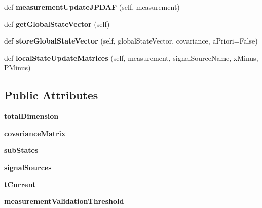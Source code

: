 \begin{DoxyCompactItemize}
\item 
def {\bfseries measurement\+Update\+J\+P\+D\+AF} (self, measurement)\hypertarget{classState_1_1ModularFilter_a0da499cc21acaf9753711553102b5469}{}\label{classState_1_1ModularFilter_a0da499cc21acaf9753711553102b5469}

\item 
def {\bfseries get\+Global\+State\+Vector} (self)\hypertarget{classState_1_1ModularFilter_a6547493c7b2ad077dfae3e76b5619a0e}{}\label{classState_1_1ModularFilter_a6547493c7b2ad077dfae3e76b5619a0e}

\item 
def {\bfseries store\+Global\+State\+Vector} (self, global\+State\+Vector, covariance, a\+Priori=False)\hypertarget{classState_1_1ModularFilter_a3c510ca8c96da3b0e26215935e18beaa}{}\label{classState_1_1ModularFilter_a3c510ca8c96da3b0e26215935e18beaa}

\item 
def {\bfseries local\+State\+Update\+Matrices} (self, measurement, signal\+Source\+Name, x\+Minus, P\+Minus)\hypertarget{classState_1_1ModularFilter_a90d6a9c3ae7a248577d4be06dd58a0c8}{}\label{classState_1_1ModularFilter_a90d6a9c3ae7a248577d4be06dd58a0c8}

\end{DoxyCompactItemize}
\subsection*{Public Attributes}
\begin{DoxyCompactItemize}
\item 
{\bfseries total\+Dimension}\hypertarget{classState_1_1ModularFilter_a40c2ac71e5d1d363f0410ce94b9e8345}{}\label{classState_1_1ModularFilter_a40c2ac71e5d1d363f0410ce94b9e8345}

\item 
{\bfseries covariance\+Matrix}\hypertarget{classState_1_1ModularFilter_a1981026f261047a45a6a7d89bbf1b7de}{}\label{classState_1_1ModularFilter_a1981026f261047a45a6a7d89bbf1b7de}

\item 
{\bfseries sub\+States}\hypertarget{classState_1_1ModularFilter_af6128daa99126397f282ec0fcdcd3e56}{}\label{classState_1_1ModularFilter_af6128daa99126397f282ec0fcdcd3e56}

\item 
{\bfseries signal\+Sources}\hypertarget{classState_1_1ModularFilter_a23afc4a8d6b45e56b68ab99d8b9d9efa}{}\label{classState_1_1ModularFilter_a23afc4a8d6b45e56b68ab99d8b9d9efa}

\item 
{\bfseries t\+Current}\hypertarget{classState_1_1ModularFilter_a2b816cacd5988012193b17fcc0032d9d}{}\label{classState_1_1ModularFilter_a2b816cacd5988012193b17fcc0032d9d}

\item 
{\bfseries measurement\+Validation\+Threshold}\hypertarget{classState_1_1ModularFilter_adf637093941f85a6ca14a122f232657a}{}\label{classState_1_1ModularFilter_adf637093941f85a6ca14a122f232657a}

\end{DoxyCompactItemize}


